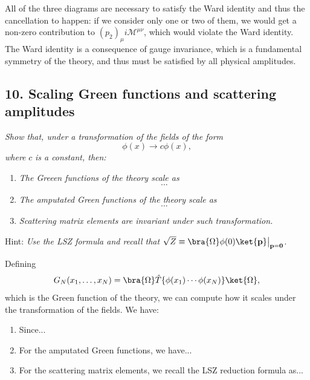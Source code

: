 \begin{remark}
    All of the three diagrams are necessary to satisfy the Ward identity and thus the cancellation to happen: if we consider only one or two of them, we would get a non-zero contribution to \((p_2)_\mu i \mathcal{M}^{\mu \nu}\), which would violate the Ward identity. The Ward identity is a consequence of gauge invariance, which is a fundamental symmetry of the theory, and thus must be satisfied by all physical amplitudes.
\end{remark}

\subsection*{10. Scaling Green functions and scattering amplitudes}

\begin{center}
    \textit{Show that, under a transformation of the fields of the form}
    \[
        \phi(x) \to c \phi(x),
    \]
    \textit{where} \(c\) \textit{is a constant, then:}
    \begin{enumerate}[label=(\alph*)]
        \item \textit{The Greeen functions of the theory scale as}
              \[
                  \dots
              \]
        \item \textit{The amputated Green functions of the theory scale as}
              \[
                  \dots
              \]
        \item \textit{Scattering matrix elements are invariant under such transformation.}
    \end{enumerate}
    Hint: \textit{Use the LSZ formula and recall that} \(\sqrt{Z} \equiv \bra{\Omega} \phi(0) \ket{\mathbf{p}} \big|_{\mathbf{p} = \mathbf{0}}\).
\end{center}

Defining
\[
    G_N (x_1, \dots, x_N) = \bra{\Omega} \hat{T} \{ \phi(x_1) \cdots \phi(x_N) \} \ket{\Omega},
\]
which is the Green function of the theory, we can compute how it scales under the transformation of the fields. We have:
\begin{enumerate}[label=(\alph*)]
    \item Since...
    \item For the amputated Green functions, we have...
    \item For the scattering matrix elements, we recall the LSZ reduction formula as...
\end{enumerate}